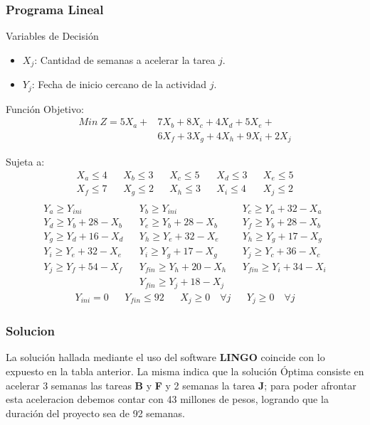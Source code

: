 \begin{homeworkProblem}

\subsubsection{Programa Lineal}
Variables de Decisión
\begin{itemize}
    \item $X_j$: Cantidad de semanas a acelerar la tarea $j$.
    \item $Y_j$: Fecha de inicio cercano de la actividad $j$.
\end{itemize}
Función Objetivo:
\begin{align*}
    Min\ Z = 5X_a + &7X_b + 8X_c + 4X_d + 5X_e + \\
                    &6X_f + 3X_g + 4X_h + 9X_i + 2X_j
\end{align*}

Sujeta a:
\begin{align*}
    &X_a \leq 4& &X_b \leq 3& &X_c \leq 5& &X_d \leq 3& &X_e \leq 5& \\
    &X_f \leq 7& &X_g \leq 2& &X_h \leq 3& &X_i \leq 4& &X_j\leq 2& \\
\end{align*}
\begin{align*}
   &Y_a \geq Y_{ini}& &Y_b \geq Y_{ini}& &Y_c \geq Y_a + 32 - X_a& \\ 
   &Y_d \geq Y_b + 28 - X_b& &Y_e \geq Y_b + 28 - X_b& &Y_f \geq Y_b + 28 - X_b& \\ 
   &Y_g \geq Y_d + 16 - X_d& &Y_h \geq Y_e + 32 - X_e& &Y_h \geq Y_g + 17 - X_g& \\ 
   &Y_i \geq Y_e + 32 - X_e& &Y_i \geq Y_g+17-X_g& &Y_j \geq Y_c + 36 - X_c&\\
   &Y_j \geq Y_f + 54 - X_f& &Y_{fin} \geq Y_h+20-X_h& &Y_{fin} \geq Y_i+34-X_i&\\
   && &Y_{fin} \geq Y_j+18-X_j& &&
\end{align*}
\begin{align*}
    &Y_{ini}=0& &Y_{fin}\leq92& &X_j\geq0 \quad \forall j& &Y_j\geq 0 \quad \forall j&
\end{align*}

\subsubsection{Solucion}

La solución hallada mediante el uso del software \textbf{LINGO} coincide con lo expuesto en la tabla anterior. La misma indica que la solución Óptima consiste en acelerar 3 semanas las tareas \textbf{B} y \textbf{F} y 2 semanas la tarea \textbf{J}; para poder afrontar esta aceleracion debemos contar con 43 millones de pesos, logrando que la duración del proyecto sea de 92 semanas.


\end{homeworkProblem}
